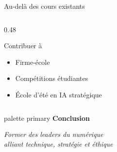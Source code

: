 \documentclass[aspectratio=169,11pt]{beamer}
\begin{document}
\begin{frame}{Au-delà des cours existants}
\begin{columns}[T]
\begin{column}{0.48\textwidth}
      \vspace{0.3em}
      
      \begin{block}{Contribuer à}
        \small
        \begin{itemize}
          \item Firme-école
          \item Compétitions étudiantes
          \item École d'été en IA stratégique
        \end{itemize}
      \end{block}
    \end{column}
  \end{columns}
\end{frame}

\begin{frame}{}
  \begin{beamercolorbox}[wd=\paperwidth,ht=2.5cm,dp=0.5cm,center]{palette primary}
    {\Large\bfseries Conclusion}
  \end{beamercolorbox}
  \vspace{2cm}
  \begin{center}
    {\large\textit{Former des leaders du numérique\\alliant technique, stratégie et éthique}}
  \end{center}
\end{frame}
\end{document}
